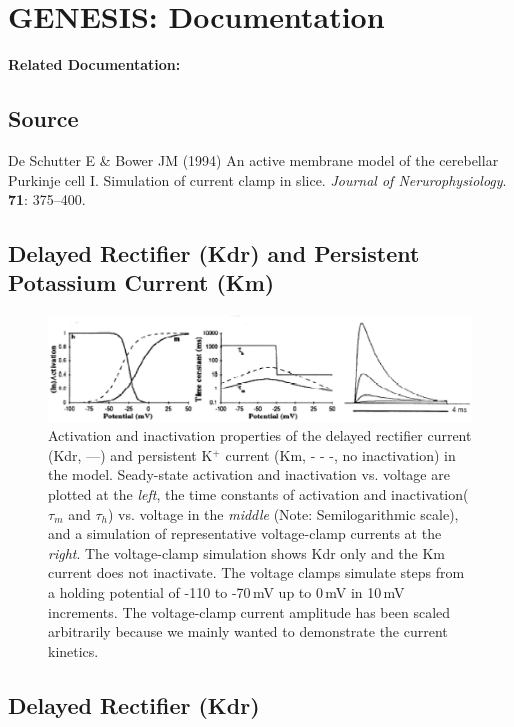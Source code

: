 \documentclass[12pt]{article}
\begin{document}
\section*{GENESIS: Documentation}

{\bf Related Documentation:}

\subsection*{Source}

De Schutter E \& Bower JM (1994) An active membrane model of the cerebellar Purkinje cell I. Simulation of current clamp in slice. {\it Journal of Nerurophysiology}. {\bf 71}: 375--400. \\

\subsection*{Delayed Rectifier (Kdr) and Persistent Potassium Current (Km)}

\begin{figure}[h]
\centering
   \includegraphics[scale=0.75]{figures/DS1.2E.eps}
   \caption{Activation and inactivation properties of the delayed rectifier current (Kdr, ---) and persistent K$^+$ current (Km, - - -, no inactivation) in the model. Seady-state activation and inactivation vs. voltage are plotted at the {\em left}, the time constants of activation and inactivation($\tau_m$ and $\tau_h$) vs. voltage in the {\em middle} (Note: Semilogarithmic scale), and a simulation of representative voltage-clamp currents at the {\em right}. The voltage-clamp simulation shows Kdr only and the Km current does not inactivate. The voltage clamps simulate steps from a holding potential of -110 to -70\,mV up to 0\,mV in 10\,mV increments. The voltage-clamp current amplitude has been scaled arbitrarily because we mainly wanted to demonstrate the current kinetics.}
   \label{fig:DS1.2E}
\end{figure}

\subsection*{Delayed Rectifier (Kdr)}
\end{document}
